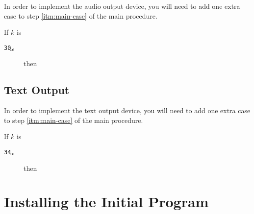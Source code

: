 \documentclass[a4paper,12pt]{article}
\newcommand{\num}[1]{\texttt{#1}\xspace}
\newcommand{\hex}[1]{\num{#1}$_{\textup{\tiny\hskip-1ex 16}}$\xspace}
\newcommand{\op}[1]{#1}
\newcommand{\NEWFRAME}  [1]{\op{\hex{30}}}
\newcommand{\PUTCHAR}   [1]{\op{\hex{34}}}
\begin{document}
In order to implement the audio output device, you will need to add one extra case to step \ref{itm:main-case} of the main procedure.

\begin{stepnumbers}[start=3]
\item If $k$ is
  \begin{description}
  \item[\NEWFRAME{}] then
  \end{description}
\end{stepnumbers}

\subsection{Text Output}

In order to implement the text output device, you will need to add one extra case to step \ref{itm:main-case} of the main procedure.

\begin{stepnumbers}[start=3]
  \setcounter{enumi}{2}
\item If $k$ is
  \begin{description}
  \item[\PUTCHAR{}] then
  \end{description}
\end{stepnumbers}

\section{Installing the Initial Program}
\end{document}

